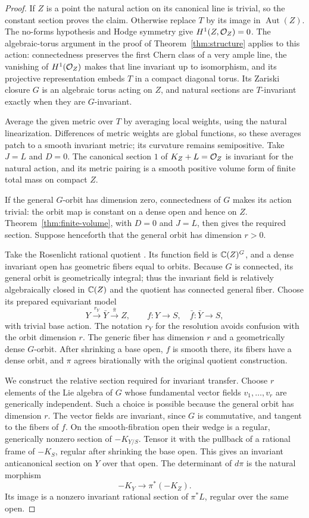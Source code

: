 \begin{proof}
If $Z$ is a point the natural action on its canonical line is trivial,
so the constant section proves the claim. Otherwise replace $T$ by
its image in $\operatorname{Aut}(Z)$. The no-forms hypothesis and
Hodge symmetry give $H^1(Z,\mathcal O_Z)=0$. The algebraic-torus argument
in the proof of Theorem~\ref{thm:structure} applies to this action:
connectedness preserves the first Chern class of a very ample line,
the vanishing of $H^1(\mathcal O_Z)$ makes that line invariant up to
isomorphism, and its projective representation embeds $T$ in a
compact diagonal torus. Its Zariski closure $G$ is an algebraic torus
acting on $Z$, and natural sections are $T$-invariant exactly when
they are $G$-invariant.

Average the given metric over $T$ by averaging local weights, using
the natural linearization. Differences of metric weights are global
functions, so these averages patch to a smooth invariant metric; its
curvature remains semipositive. Take $J=L$ and $D=0$. The canonical
section $1$ of $K_Z+L=\mathcal O_Z$ is invariant for the natural action,
and its metric pairing is a smooth positive volume form of finite
total mass on compact $Z$.

If the general $G$-orbit has dimension zero, connectedness of $G$
makes its action trivial: the orbit map is constant on a dense open
and hence on $Z$. Theorem~\ref{thm:finite-volume}, with $D=0$ and
$J=L$, then gives the required section. Suppose henceforth that the
general orbit has dimension $r>0$.

Take the Rosenlicht rational quotient
\cite{Rosenlicht1956,BellGhiocaReichstein2017}. Its function field is
$\mathbb C(Z)^G$, and a dense invariant open has geometric fibers equal
to orbits. Because $G$ is connected, its general orbit is geometrically
integral; thus the invariant field is relatively algebraically closed
in $\mathbb C(Z)$ and the quotient has connected general fiber. Choose its
prepared equivariant model
\[
      Y\xrightarrow{r_Y}\bar Y\xrightarrow{\bar\pi}Z,
          \qquad f:Y\to S,\quad\bar f:\bar Y\to S,
\]
with trivial base action. The notation $r_Y$ for the resolution avoids
confusion with the orbit dimension $r$. The generic fiber has dimension
$r$ and a geometrically dense $G$-orbit. After shrinking a base open,
$f$ is smooth there, its fibers have a dense orbit, and $\pi$ agrees
birationally with the original quotient construction.

We construct the relative section required for invariant transfer.
Choose $r$ elements of the Lie algebra of $G$ whose fundamental vector
fields $v_1,\ldots,v_r$ are generically independent. Such a choice is
possible because the general orbit has dimension $r$. The vector
fields are invariant, since $G$ is commutative, and tangent to the
fibers of $f$. On the smooth-fibration open their wedge is a regular,
generically nonzero section of $-K_{Y/S}$. Tensor it with the pullback
of a rational frame of $-K_S$, regular after shrinking the base open.
This gives an invariant anticanonical section on $Y$ over that open.
The determinant of $d\pi$ is the natural morphism
\[
                     -K_Y\longrightarrow\pi^*(-K_Z).
\]
Its image is a nonzero invariant rational section of $\pi^*L$,
regular over the same open.


\end{proof}
